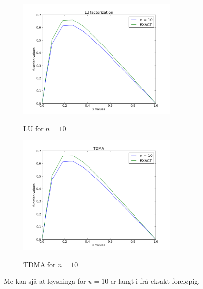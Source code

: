\documentclass[11pt, a4paper]{article}
\begin{document}
    \begin{figure}[H]
      \centering
      \includegraphics[width=300px]{LU10.png} \\
      \caption{LU for $n = 10$}
    \end{figure}
    \begin{figure}[H]
      \centering
      \includegraphics[width=300px]{TDMA10.png} \\
      \caption{TDMA for $n = 10$}
    \end{figure}

    Me kan sjå at løysninga for $n = 10$ er langt i frå eksakt foreløpig.
\end{document}
